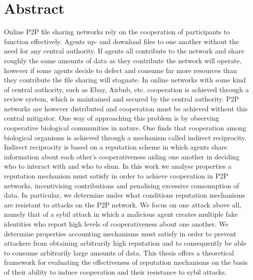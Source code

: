 \chapter*{Abstract}
\label{chap:Abstract}

Online P2P file sharing networks rely on the cooperation of participants to function effectively. Agents up- and download files to one another without the need for any central authority. If agents all contribute to the network and share roughly the same amounts of data as they contribute the network will operate, however if some agents decide to defect and consume far more resources than they contribute the file sharing will stagnate. In online networks with some kind of central authority, such as Ebay, Airbnb, etc. cooperation is achieved through a review system, which is maintained and secured by the central authority. P2P networks are however distributed and cooperation must be achieved without this central mitigator. One way of approaching this problem is by observing cooperative biological communities in nature. One finds that cooperation among biological organisms is achieved through a mechanism called indirect reciprocity. Indirect reciprocity is based on a reputation scheme in which agents share information about each other's cooperativeness aiding one another in deciding who to interact with and who to shun. In this work we analyse properties a reputation mechanism must satisfy in order to achieve cooperation in P2P networks, incentivising contributions and penalising excessive comsumption of data. In particular, we determine under what conditions reputation mechanisms are resistant to attacks on the P2P network. We focus on one attack above all, namely that of a sybil attack in which a malicious agent creates multiple fake identities who report high levels of cooperativeness about one another. We determine properties accounting mechanisms must satisfy in order to prevent attackers from obtaining arbitrarily high reputation and to consequently be able to consume arbitrarily large amounts of data. This thesis offers a theoretical framework for evaluating the effectiveness of reputation mechanisms on the basis of their ability to induce cooperation and their resistance to sybil attacks.

